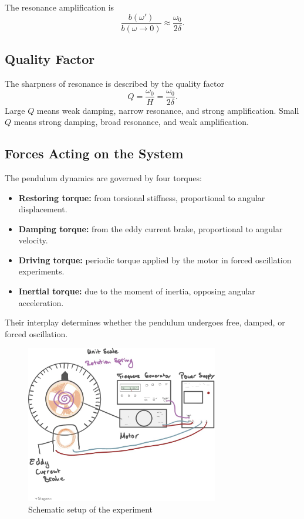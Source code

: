 The resonance amplification is
\begin{equation}
    \frac{b(\omega')}{b(\omega \to 0)} \approx \frac{\omega_0}{2 \delta}.
    \label{eq:reso_amp}
\end{equation}

\subsection{Quality Factor}
The sharpness of resonance is described by the quality factor
\begin{equation}
Q = \frac{\omega_0}{H} = \frac{\omega_0}{2 \delta}.
\end{equation}
Large $Q$ means weak damping, narrow resonance, and strong amplification. Small $Q$ means strong damping, broad resonance, and weak amplification.

\subsection{Forces Acting on the System}
The pendulum dynamics are governed by four torques:
\begin{itemize}
    \item \textbf{Restoring torque:} from torsional stiffness, proportional to angular displacement.
    \item \textbf{Damping torque:} from the eddy current brake, proportional to angular velocity.
    \item \textbf{Driving torque:} periodic torque applied by the motor in forced oscillation experiments.
    \item \textbf{Inertial torque:} due to the moment of inertia, opposing angular acceleration.
\end{itemize}

Their interplay determines whether the pendulum undergoes free, damped, or forced oscillation.

\begin{figure}[h!]
    \centering
    \includegraphics[width=0.75\textwidth]{img/13/aufbau.jpg}
    \onecolumn
    \caption{Schematic setup of the experiment}
    \twocolumn
\end{figure}